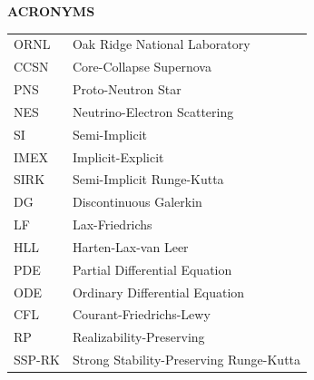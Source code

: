 \documentclass[11pt,letterpaper,twoside,english,final]{article}
\begin{document}

\setcounter{page}{3}

\newpage

\clearemptydoublepage
{} 
\begin{centering}
\listoffigures 
\end{centering}


\newpage

\clearemptydoublepage
{} 
\begin{centering}
\listoftables 
\end{centering}


\newpage


\clearemptydoublepage
{}
{} 
\begin{center}
{\bf{ACRONYMS}}
\end{center}

\begin{table}[h]
\vspace{-6pt}
\begin{tabular}{l l} 
ORNL & Oak Ridge National Laboratory \\
CCSN & Core-Collapse Supernova \\
PNS & Proto-Neutron Star \\
NES & Neutrino-Electron Scattering \\
SI & Semi-Implicit \\
IMEX & Implicit-Explicit \\
SIRK & Semi-Implicit Runge-Kutta \\
DG & Discontinuous Galerkin \\
LF & Lax-Friedrichs \\
HLL & Harten-Lax-van Leer \\
PDE & Partial Differential Equation \\
ODE & Ordinary Differential Equation \\
CFL & Courant-Friedrichs-Lewy \\
RP & Realizability-Preserving \\
SSP-RK & Strong Stability-Preserving Runge-Kutta \\
\end{tabular}
\end{table}
\end{document}
